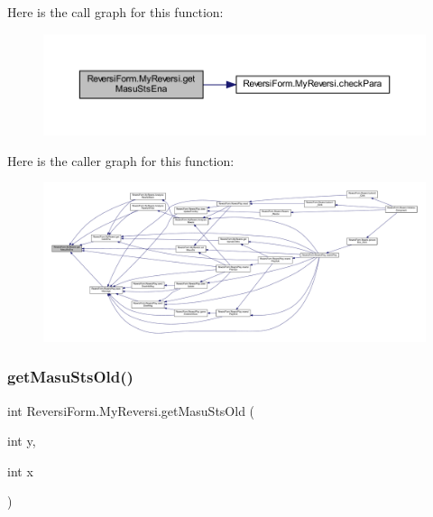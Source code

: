 Here is the call graph for this function\+:\nopagebreak
\begin{figure}[H]
\begin{center}
\leavevmode
\includegraphics[width=350pt]{class_reversi_form_1_1_my_reversi_ae8404068c47751d53c4b430d635a1bb2_cgraph}
\end{center}
\end{figure}
Here is the caller graph for this function\+:\nopagebreak
\begin{figure}[H]
\begin{center}
\leavevmode
\includegraphics[width=350pt]{class_reversi_form_1_1_my_reversi_ae8404068c47751d53c4b430d635a1bb2_icgraph}
\end{center}
\end{figure}
\mbox{\label{class_reversi_form_1_1_my_reversi_abd6f4b9d6355af3175ac885731338705}} 
\subsubsection{\texorpdfstring{get\+Masu\+Sts\+Old()}{getMasuStsOld()}}
{\footnotesize\ttfamily int Reversi\+Form.\+My\+Reversi.\+get\+Masu\+Sts\+Old (\begin{DoxyParamCaption}\item[{int}]{y,  }\item[{int}]{x }\end{DoxyParamCaption})}



